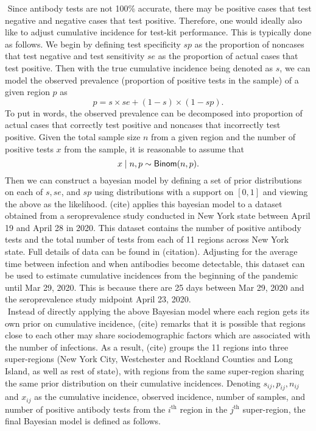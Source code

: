 \newline$ $
Since antibody tests are not 100\% accurate, there may be positive cases that test negative and negative cases that test positive. Therefore, one would ideally also like to adjust cumulative incidence for test-kit performance. This is typically done as follows. We begin by defining test specificity $sp$ as the proportion of noncases that test negative and test sensitivity $se$ as the proportion of actual cases that test positive. Then with the true cumulative incidence being denoted as $s$, we can model the observed prevalence (proportion of positive tests in the sample) of a given region $p$ as
\[
p = s \times se + (1-s) \times (1 - sp).
\]
To put in words, the observed prevalence can be decomposed into proportion of actual cases that correctly test positive and noncases that incorrectly test positive. Given the total sample size $n$ from a given region and the number of positive tests $x$ from the sample, it is reasonable to assume that
\[
x \mid n, p \sim {\sf{Binom}}(n, p).
\]
Then we can construct a bayesian model by defining a set of prior distributions on each of $s, se$, and $sp$ using distributions with a support on $[0,1]$ and viewing the above as the likelihood. (cite) applies this bayesian model to a dataset obtained from a seroprevalence study conducted in New York state between April 19 and April 28 in 2020. This dataset contains the number of positive antibody tests and the total number of tests from each of 11 regions across New York state. Full details of data can be found in (citation). Adjusting for the average time between infection and when antibodies become detectable, this dataset can be used to estimate cumulative incidences from the beginning of the pandemic until Mar 29, 2020. This is because there are 25 days between Mar 29, 2020 and the seroprevalence study midpoint April 23, 2020.\\
\newline$ $
Instead of directly applying the above Bayesian model where each region gets its own prior on cumulative incidence, (cite) remarks that it is possible that regions close to each other may share sociodemographic factors which are associated with the number of infections. As a result, (cite) groups the 11 regions into three super-regions (New York City, Westchester and Rockland Counties and Long Island, as well as rest of state), with regions from the same super-region sharing the same prior distribution on their cumulative incidences. Denoting $s_{ij}, p_{ij}, n_{ij}$ and $x_{ij}$ as the cumulative incidence, observed incidence, number of samples, and number of positive antibody tests from the $i^\text{th}$ region in the $j^\text{th}$ super-region, the final Bayesian model is defined as follows.
